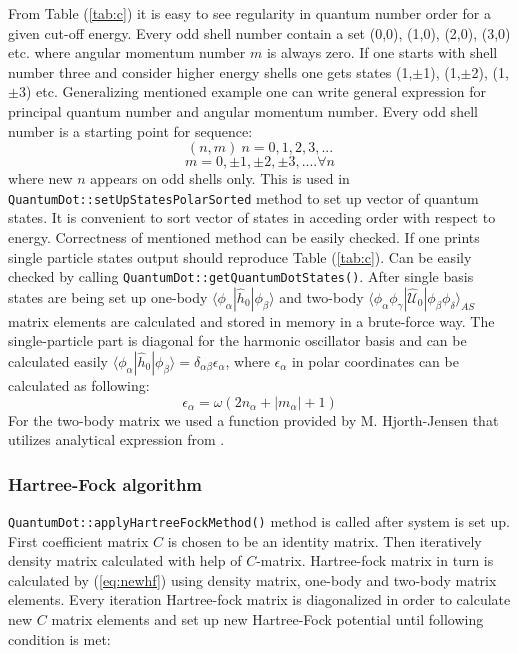 \documentclass[10pt]{article}
\newcommand*{\hatU}{\hat{\mathcal{U}}}
\newcommand{\code}[1]{\colorbox{coding}{\texttt{#1}}}
\begin{document}
From Table (\ref{tab:c}) it is easy to see regularity in quantum number order for a given cut-off energy. Every odd shell number contain a set (0,0), (1,0), (2,0), (3,0) etc. where angular momentum number $m$ is always zero.
If one starts with shell number three and consider higher energy shells one gets states (1,$\pm$1), (1,$\pm$2), (1,$\pm$3) etc.
Generalizing mentioned example one can write general expression for principal quantum number and angular momentum number.
Every odd shell number is a starting point for sequence:
\[
(n, m)\ 
n = 0, 1, 2, 3, ... 
\]
\[
m = 0, \pm 1, \pm 2, \pm 3, .... \forall  n
\]
where new $n$ appears on odd shells only.
This is used in \code{QuantumDot::setUpStatesPolarSorted} method to set up vector of quantum states. It is convenient to sort vector of states in acceding order with respect to energy.
Correctness of mentioned method can be easily checked. If one prints single particle states output should reproduce Table (\ref{tab:c}). Can be easily checked by calling \code{QuantumDot::getQuantumDotStates()}.
After single basis states are being set up one-body $\langle \phi_{\alpha} | \hat{h}_0 | \phi_{\beta} \rangle$ and two-body $\langle \phi_{\alpha}\phi_{\gamma}|\hatU_{0}|\phi_{\beta}\phi_{\delta}\rangle_{AS}$ matrix elements are calculated and stored in memory in a brute-force way. The single-particle part is diagonal for the harmonic oscillator basis and can be calculated easily $\langle \phi_{\alpha} | \hat{h}_0 | \phi_{\beta} \rangle = \delta_{\alpha\beta}\epsilon_{\alpha}$, where $\epsilon_{\alpha}$ in polar coordinates can be calculated as following:
\[
\epsilon_{\alpha} = \omega(2n_{\alpha} + |m_{\alpha}| + 1)
\]
For the two-body matrix we used a function provided by M. Hjorth-Jensen that utilizes analytical expression from \cite{Anisimovas}.  

\subsubsection{Hartree-Fock algorithm}

\code{QuantumDot::applyHartreeFockMethod()} method is called after system is set up. First coefficient matrix $C$ is chosen to be an identity matrix.
Then iteratively density matrix calculated with help of $C$-matrix. Hartree-fock matrix in turn is calculated by (\ref{eq:newhf}) using density matrix, one-body and two-body matrix elements.
Every iteration Hartree-fock matrix is diagonalized in order to calculate new $C$ matrix elements and set up new Hartree-Fock potential until following condition is met:
\end{document}
